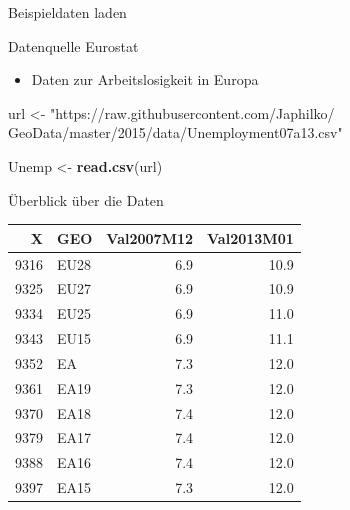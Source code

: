 \documentclass[ignorenonframetext,]{beamer}
\newenvironment{Shaded}{\begin{snugshade}}{\end{snugshade}}
\newcommand{\KeywordTok}[1]{\textcolor[rgb]{0.13,0.29,0.53}{\textbf{#1}}}
\newcommand{\StringTok}[1]{\textcolor[rgb]{0.31,0.60,0.02}{#1}}
\newcommand{\NormalTok}[1]{#1}
\providecommand{\tightlist}{%
  \setlength{\itemsep}{0pt}\setlength{\parskip}{0pt}}
\begin{document}
\begin{frame}[fragile]{Beispieldaten laden}

\begin{block}{Datenquelle Eurostat}

\begin{itemize}
\tightlist
\item
  Daten zur Arbeitslosigkeit in Europa
\end{itemize}

\begin{Shaded}
\begin{Highlighting}[]
\NormalTok{url <-}\StringTok{ "https://raw.githubusercontent.com/Japhilko/}
\StringTok{GeoData/master/2015/data/Unemployment07a13.csv"}

\NormalTok{Unemp <-}\StringTok{ }\KeywordTok{read.csv}\NormalTok{(url) }
\end{Highlighting}
\end{Shaded}

\end{block}

\end{frame}

\begin{frame}{Überblick über die Daten}

\begin{longtable}[]{@{}rlrr@{}}
\toprule
X & GEO & Val2007M12 & Val2013M01\tabularnewline
\midrule
\endhead
9316 & EU28 & 6.9 & 10.9\tabularnewline
9325 & EU27 & 6.9 & 10.9\tabularnewline
9334 & EU25 & 6.9 & 11.0\tabularnewline
9343 & EU15 & 6.9 & 11.1\tabularnewline
9352 & EA & 7.3 & 12.0\tabularnewline
9361 & EA19 & 7.3 & 12.0\tabularnewline
9370 & EA18 & 7.4 & 12.0\tabularnewline
9379 & EA17 & 7.4 & 12.0\tabularnewline
9388 & EA16 & 7.4 & 12.0\tabularnewline
9397 & EA15 & 7.3 & 12.0\tabularnewline
\bottomrule
\end{longtable}

\end{frame}
\end{document}
